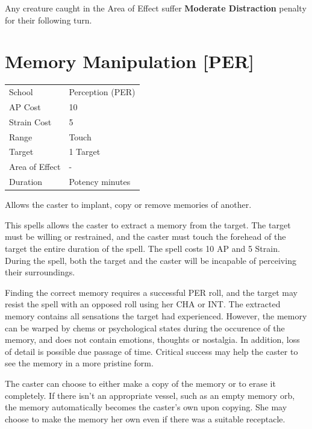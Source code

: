 \documentclass[11pt,a4paper,twocolumn]{book}
\begin{document}
Any creature caught in the Area of Effect suffer \textbf{Moderate Distraction} penalty for their following turn.

\vfill


\section*{Memory Manipulation [PER]}
{
	\begin{tabu} to 75mm{| X[l,4] | X[l,7] |}
		\hline
		School 			& Perception (PER) 		\\
        AP Cost	      	& 10 					\\
        Strain Cost     & 5 					\\
        Range     		& Touch					\\
        Target      	& 1 Target				\\
        Area of Effect  & -  	 				\\
        Duration     	& Potency minutes			\\ \hline
	\end{tabu}
		
}

\medskip
Allows the caster to implant, copy or remove memories of another.

This spells allows the caster to extract a memory from the target. The target must be willing or restrained, and the caster must touch the forehead of the target the entire duration of the spell. The spell costs 10 AP and 5 Strain. During the spell, both the target and the caster will be incapable of perceiving their surroundings.

Finding the correct memory requires a successful PER roll, and the target may resist the spell with an opposed roll using her CHA or INT. The extracted memory contains all sensations the target had experienced. However, the memory can be warped by chems or psychological states during the occurence of the memory, and does not contain emotions, thoughts or nostalgia. In addition, loss of detail is possible due passage of time. Critical success may help the caster to see the memory in a more pristine form.

The caster can choose to either make a copy of the memory or to erase it completely. If there isn't an appropriate vessel, such as an empty memory orb, the memory automatically becomes the caster's own upon copying. She may choose to make the memory her own even if there was a suitable receptacle.
\end{document}
